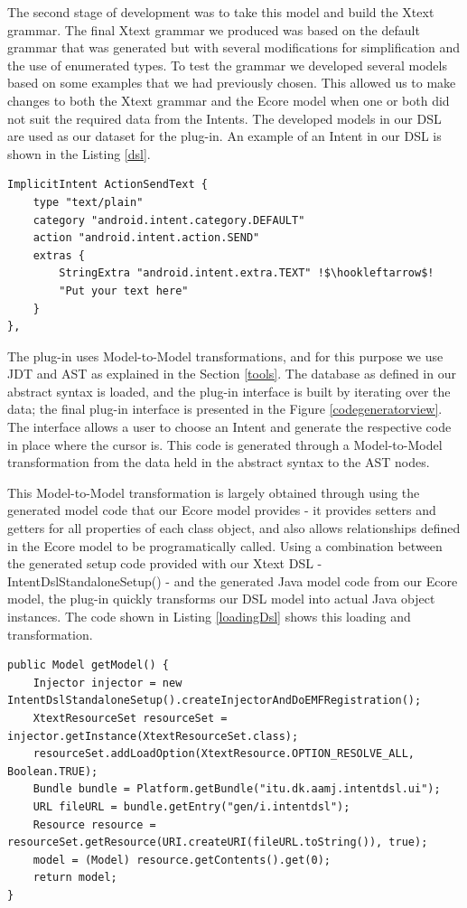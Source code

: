 The second stage of development was to take this model and build the Xtext grammar. The final Xtext grammar we produced was based on the default grammar that was generated but with several modifications for simplification and the use of enumerated types. To test the grammar we developed several models based on some examples that we had previously chosen. This allowed us to make changes to both the Xtext grammar and the Ecore model when one or both did not suit the required data from the Intents. The developed models in our DSL are used as our dataset for the plug-in. An example of an Intent in our DSL is shown in the Listing \ref{dsl}.

{\footnotesize\begin{lstlisting}[escapechar=!,label=dsl,caption=Intent in DSL]
ImplicitIntent ActionSendText {
	type "text/plain"
	category "android.intent.category.DEFAULT"
	action "android.intent.action.SEND"
	extras {
		StringExtra "android.intent.extra.TEXT" !$\hookleftarrow$!
		"Put your text here"
	}
},
\end{lstlisting}}

The plug-in uses Model-to-Model transformations, and for this purpose we use JDT and AST as explained in the Section \ref{tools}. The database as defined in our abstract syntax is loaded, and the plug-in interface is built by iterating over the data; the final plug-in interface is presented in the Figure \ref{codegeneratorview}. The interface allows a user to choose an Intent and generate the respective code in place where the cursor is. This code is generated through a Model-to-Model transformation from the data held in the abstract syntax to the AST nodes.

This Model-to-Model transformation is largely obtained through using the generated model code that our Ecore model provides - it provides setters and getters for all properties of each class object, and also allows relationships defined in the Ecore model to be programatically called. Using a combination between the generated setup code provided with our Xtext DSL - IntentDslStandaloneSetup() - and the generated Java model code from our Ecore model, the plug-in quickly transforms our DSL model into actual Java object instances. The code shown in Listing \ref{loadingDsl} shows this loading and transformation.

{\footnotesize\begin{lstlisting}[label=loadingDsl,caption=Loading a DSL object into Java application]
public Model getModel() {
	Injector injector = new IntentDslStandaloneSetup().createInjectorAndDoEMFRegistration();
	XtextResourceSet resourceSet = injector.getInstance(XtextResourceSet.class);
	resourceSet.addLoadOption(XtextResource.OPTION_RESOLVE_ALL, Boolean.TRUE);
	Bundle bundle = Platform.getBundle("itu.dk.aamj.intentdsl.ui");
	URL fileURL = bundle.getEntry("gen/i.intentdsl");
	Resource resource = resourceSet.getResource(URI.createURI(fileURL.toString()), true);
	model = (Model) resource.getContents().get(0);
	return model;
}
\end{lstlisting}}

